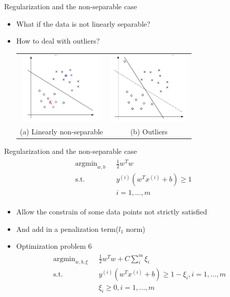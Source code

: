 \documentclass{beamer}
\begin{document}
\begin{frame}{Regularization and the non-separable case}
\begin{itemize}
\item What if the data is not linearly separable?
\item How to deal with outliers?
\begin{tabular}{cc}

\includegraphics[width=4cm]{images/img6.png}
& 
\includegraphics[width=4cm]{images/img7.png} \\

(a) Linearly non-separable & (b) Outliers\\
\end{tabular}
\end{itemize}
\end{frame}

\begin{frame}{Regularization and the non-separable case}
\begin{align}
\begin{split}
\text{argmin}_{w, b}\text{   }&\frac{1}{2}w^Tw \\
\text{s.t.} \text{   }&y^{(i)}\left(w^Tx^{(i)} + b\right) \geq 1\\
&i = 1,...,m
\end{split}
\end{align}
\begin{itemize}
\item Allow the constrain of some data points not strictly satisfied
\item And add in a penalization term($l_1$ norm)
\item Optimization problem 6
\begin{align}
\begin{split}
\text{argmin}_{w, b, \xi}\text{   }&\frac{1}{2}w^Tw + C\sum_i^m \xi_i  \\
\text{s.t.} \text{   }&y^{(i)}\left(w^Tx^{(i)} + b\right) \geq 1-\xi_i, i = 1,...,m\\
&\xi_i \geq 0, i = 1,...,m\\
\end{split}
\end{align}
\end{itemize}
\end{frame}
\end{document}
